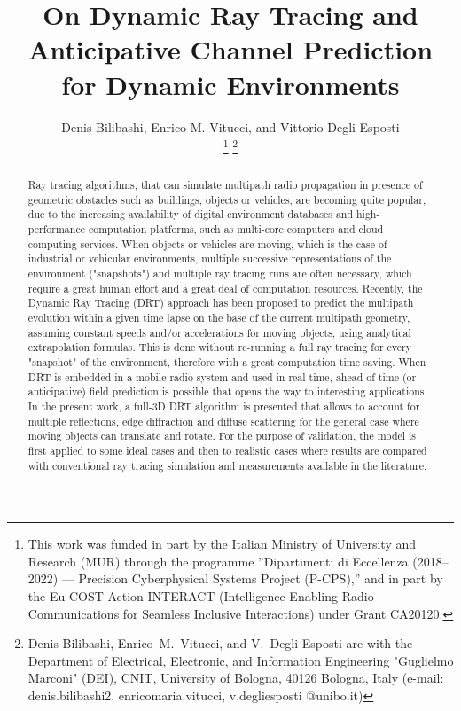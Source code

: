 \documentclass[lettersize,journal]{IEEEtran}
\begin{document}
\title{On Dynamic Ray Tracing and Anticipative Channel Prediction for Dynamic Environments}

\author{Denis Bilibashi, Enrico M. Vitucci, and Vittorio Degli-Esposti

\thanks{This work was funded in part by the Italian Ministry of University and Research (MUR) through the programme ”Dipartimenti di Eccellenza (2018–2022) — Precision Cyberphysical Systems Project (P-CPS),” and in part by the Eu COST Action INTERACT (Intelligence-Enabling Radio Communications for Seamless Inclusive Interactions) under Grant CA20120.}
\thanks{Denis Bilibashi, Enrico~M.~Vitucci, and V.~Degli-Esposti are with the Department of Electrical, Electronic, and Information Engineering "Guglielmo Marconi" (DEI), CNIT, University of Bologna, 40126 Bologna, Italy (e-mail: denis.bilibashi2, enricomaria.vitucci, v.degliesposti @unibo.it)}
}%




\maketitle

\begin{abstract}
Ray tracing algorithms, that can simulate multipath radio propagation in presence of geometric obstacles such as buildings, objects or vehicles, are becoming quite popular, due to the increasing availability of digital environment databases and  high-performance computation platforms, such as multi-core computers and cloud computing services. When objects or vehicles are moving, which is the case of industrial or vehicular environments, multiple successive representations of the environment ("snapshots") and multiple ray tracing runs are often necessary, which require a great human effort and a great deal of computation resources.
Recently, the Dynamic Ray Tracing (DRT) approach has been proposed to predict the multipath evolution within a given time lapse on the base of the current multipath geometry, assuming constant speeds and/or accelerations for moving objects, using  analytical extrapolation formulas.  This is done without re-running a full ray tracing for every "snapshot" of the environment, therefore with a great computation time saving. When DRT is embedded in a mobile radio system and used in real-time, ahead-of-time (or anticipative) field prediction is possible that opens the way to interesting applications. In the present work, a full-3D DRT algorithm is presented that allows to account for multiple reflections, edge diffraction and diffuse scattering for the general case where moving objects can translate and rotate. For the purpose of validation, the model is first applied to some ideal cases and then to realistic cases where results are compared with conventional ray tracing simulation and measurements available in the literature.
\end{abstract}
\end{document}
